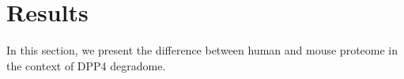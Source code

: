 \section{Results}
In this section, we present the difference between human and mouse proteome in the context of DPP4 degradome. 


